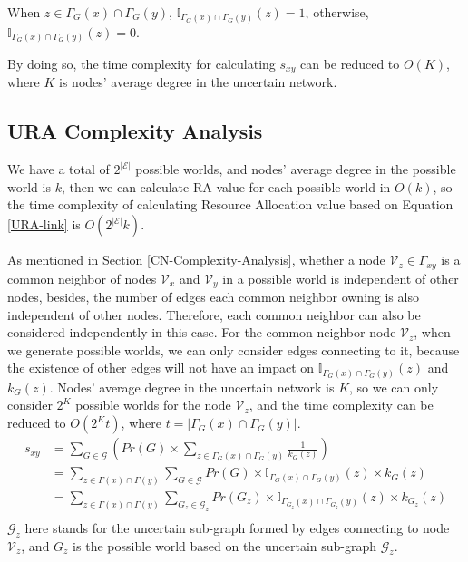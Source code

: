 \documentclass[\main/thesis.tex]{subfiles}
\begin{document}
When $z\in \Gamma_G(x)\cap\Gamma_G(y)$, $\mathbb{I}_{\Gamma_G(x)\cap\Gamma_G(y)}(z)=1$, otherwise, $\mathbb{I}_{\Gamma_G(x)\cap\Gamma_G(y)}(z)=0$.

By doing so, the time complexity for calculating $s_{xy}$ can be reduced to $O(K)$, where $K$ is nodes' average degree in the uncertain network.
\subsection{URA Complexity Analysis}
We have a total of $2^{|\mathcal{E}|}$ possible worlds, and nodes' average degree in the possible world is $k$, then we can calculate RA value for each possible world in $O(k)$, so the time complexity of calculating Resource Allocation value based on Equation \ref{URA-link} is $O(2^{|\mathcal{E}|}k)$.

As mentioned in Section \ref{CN-Complexity-Analysis}, whether a node $\mathcal{V}_z \in \Gamma_{xy}$ is a common neighbor of nodes $\mathcal{V}_x$ and $\mathcal{V}_y$ in a possible world is independent of other nodes, besides, the number of edges each common neighbor owning is also independent of other nodes.  Therefore, each common neighbor can also be considered independently in this case. For the common neighbor node $\mathcal{V}_z$, when we generate possible worlds, we can only consider edges connecting to it, because the existence of other edges will not have an impact on $\mathbb{I}_{\Gamma_G(x)\cap\Gamma_G(y)}(z)$ and $k_G(z)$. Nodes' average degree in the uncertain network is $K$, so we can only consider $2^K$ possible worlds for the node $\mathcal{V}_z$, and the time complexity can be reduced to $O(2^{K}t)$, where $t=|\Gamma_G(x)\cap\Gamma_G(y)|$. 
\begin{align*}
s_{xy}&=\sum_{G\in \mathcal{G}}( Pr(G)\times\sum_{z\in \Gamma_G(x)\cap\Gamma_G(y)}\frac{1}{k_G(z)})\\
&=\sum_{z\in \Gamma(x)\cap\Gamma(y)}\sum_{G\in \mathcal{G}}Pr(G)\times\mathbb{I}_{\Gamma_G(x)\cap\Gamma_G(y)}(z)\times k_G(z)\\
&=\sum_{z\in \Gamma(x)\cap\Gamma(y)}\sum_{{G_z}\in \mathcal{G}_z}Pr({G_z})\times\mathbb{I}_{\Gamma_{G_z}(x)\cap\Gamma_{G_z}(y)}(z)\times k_{G_z}(z)\\
\end{align*}
$\mathcal{G}_z$ here stands for the uncertain sub-graph formed by edges connecting to node $\mathcal{V}_z$, and $G_z$ is the possible world based on the uncertain sub-graph $\mathcal{G}_z$.
\end{document}
